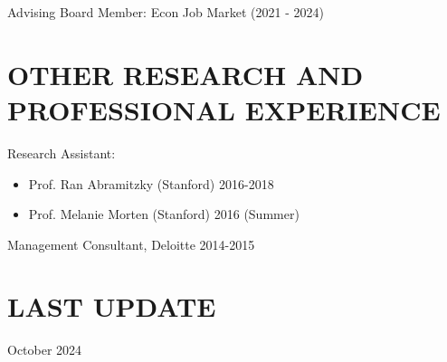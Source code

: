 \documentclass[margin]{res} %
\begin{document}
\begin{resume}
Advising Board Member: Econ Job Market (2021 - 2024)

 
\section{OTHER RESEARCH AND PROFESSIONAL EXPERIENCE}
 Research Assistant:
\begin{itemize}
	\item Prof. Ran Abramitzky (Stanford) \hfill 2016-2018
	\item Prof. Melanie Morten (Stanford) \hfill 2016 (Summer)
\end{itemize}
 
 Management Consultant, Deloitte \hfill 2014-2015 

\section{LAST UPDATE} 
October 2024

\end{resume}
\end{document}
